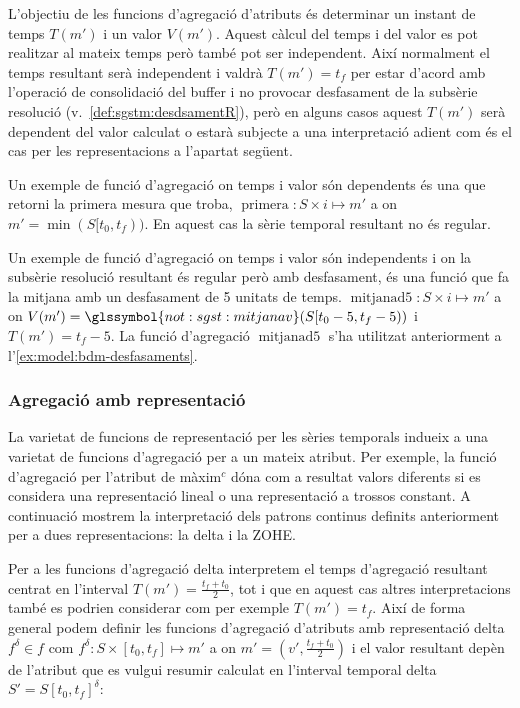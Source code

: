 L'objectiu de les funcions d'agregació d'atributs és determinar un
instant de temps $T(m')$ i un valor $V(m')$. Aquest càlcul del temps i
del valor es pot realitzar al mateix temps però també pot ser
independent. Així normalment el temps resultant serà independent i
valdrà $T(m')=t_f$ per estar d'acord amb l'operació de consolidació
del buffer i no provocar desfasament de la subsèrie resolució
(v.~\autoref{def:sgstm:desdsamentR}), però en alguns casos aquest
$T(m')$ serà dependent del valor calculat o estarà subjecte a una
interpretació adient com és el cas per les representacions a
l'apartat següent.


Un exemple de funció d'agregació on temps i valor són dependents és
una que retorni la primera mesura que troba, $\operatorname{primera}:
S \times i \mapsto m'$ a on $m' = \min(S[t_0,t_f))$. En aquest cas la
sèrie temporal resultant no és regular.


Un exemple de funció d'agregació on temps i valor són independents i
on la subsèrie resolució resultant és regular però amb desfasament, és
una funció que fa la mitjana amb un desfasament de 5 unitats de temps.
$\operatorname{mitjanad5}: S \times i \mapsto m'$ a on $V(m')=
\glssymbol{not:sgst:mitjanav}(S[t_0-5,t_f-5))$ i $T(m')=t_f-5$. La
funció d'agregació $\operatorname{mitjanad5}$ s'ha utilitzat
anteriorment a l'\autoref{ex:model:bdm-desfasaments}.







\subsubsection{Agregació amb representació}

La varietat de funcions de representació per les sèries temporals
indueix a una varietat de funcions d'agregació per a un mateix
atribut. Per exemple, la funció d'agregació per l'atribut de màxim$^c$
dóna com a resultat valors diferents si es considera una representació
lineal o una representació a trossos constant. A continuació mostrem
la interpretació dels patrons continus definits anteriorment per a
dues representacions: la delta i la ZOHE.

Per a les funcions d'agregació delta interpretem el temps d'agregació
resultant centrat en l'interval $T(m')=\frac{t_f+t_0}{2}$, tot i que
en aquest cas altres interpretacions també es podrien considerar com
per exemple $T(m')=t_f$. Així de forma general podem definir les
funcions d'agregació d'atributs amb representació delta $f^\delta\in
f$ com $f^\delta: S \times [t_0,t_f] \mapsto m'$ a on
$m'=(v',\frac{t_f+t_0}{2})$ i el valor resultant depèn de l'atribut
que es vulgui resumir calculat en l'interval temporal delta
$S'=S[t_0,t_f]^\delta$:

